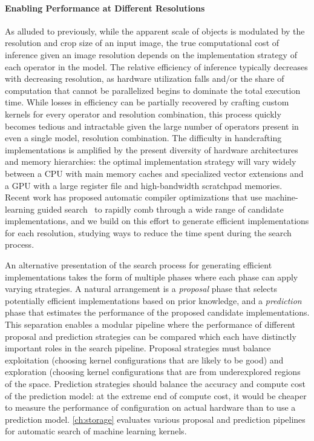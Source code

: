\paragraph{Enabling Performance at Different Resolutions}
As alluded to previously, while the apparent scale of objects is modulated by the resolution and crop size of an input image, the true computational cost of inference given an image resolution depends on the implementation strategy of each operator in the model.
The relative efficiency of inference typically decreases with decreasing resolution, as hardware utilization falls and/or the share of computation that cannot be parallelized begins to dominate the total execution time.
While losses in efficiency can be partially recovered by crafting custom kernels for every operator and resolution combination, this process quickly becomes tedious and intractable given the large number of operators present in even a single model, resolution combination.
The difficulty in handcrafting implementations is amplified by the present diversity of hardware architectures and memory hierarchies: the optimal implementation strategy will vary widely between a CPU with main memory caches and specialized vector extensions and a GPU with a large register file and high-bandwidth scratchpad memories.
Recent work has proposed automatic compiler optimizations that use machine-learning guided search~\cite{chen2018tvm, chen2018learning, zheng2020ansor} to rapidly comb through a wide range of candidate implementations, and we build on this effort to generate efficient implementations for each resolution, studying ways to reduce the time spent during the search process.

An alternative presentation of the search process for generating efficient implementations takes the form of multiple phases where each phase can apply varying strategies.
A natural arrangement is a \emph{proposal} phase that selects potentially efficient implementations based on prior knowledge, and a \emph{prediction} phase that estimates the performance of the proposed candidate implementations.
This separation enables a modular pipeline where the performance of different proposal and prediction strategies can be compared which each have distinctly important roles in the search pipeline.
Proposal strategies must balance exploitation (choosing kernel configurations that are likely to be good) and exploration (choosing kernel configurations that are from underexplored regions of the space.
Prediction strategies should balance the accuracy and compute cost of the prediction model: at the extreme end of compute cost, it would be cheaper to measure the performance of configuration on actual hardware than to use a prediction model.
\autoref{ch:storage} evaluates various proposal and prediction pipelines for automatic search of machine learning kernels.


